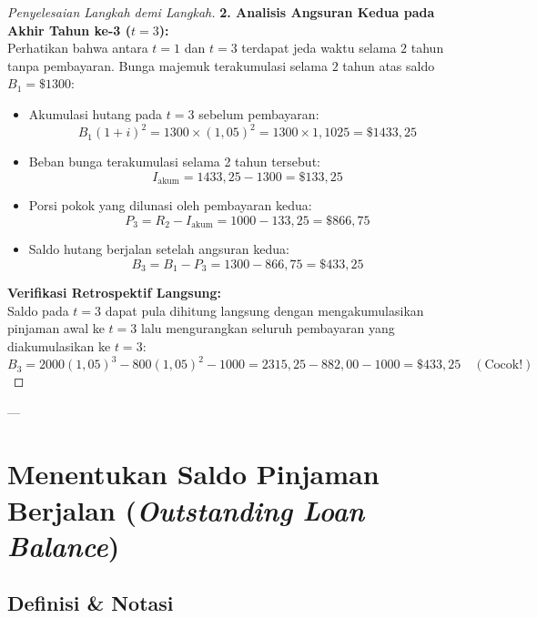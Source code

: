 \documentclass[11pt,a4paper]{article}
\begin{document}
\begin{proof}[Penyelesaian Langkah demi Langkah]
\noindent\textbf{2. Analisis Angsuran Kedua pada Akhir Tahun ke-3 ($t=3$):}\\[0.3em]
Perhatikan bahwa antara $t=1$ dan $t=3$ terdapat jeda waktu selama $2$ tahun tanpa pembayaran. Bunga majemuk terakumulasi selama $2$ tahun atas saldo $B_1 = \$1300$:
\begin{itemize}
    \item Akumulasi hutang pada $t=3$ sebelum pembayaran:
    \begin{equation*}
        B_1 (1+i)^2 = 1300 \times (1{,}05)^2 = 1300 \times 1{,}1025 = \$1433{,}25
    \end{equation*}
    \item Beban bunga terakumulasi selama 2 tahun tersebut:
    \begin{equation*}
        I_{\text{akum}} = 1433{,}25 - 1300 = \$133{,}25
    \end{equation*}
    \item Porsi pokok yang dilunasi oleh pembayaran kedua:
    \begin{equation*}
        P_3 = R_2 - I_{\text{akum}} = 1000 - 133{,}25 = \$866{,}75
    \end{equation*}
    \item Saldo hutang berjalan setelah angsuran kedua:
    \begin{equation*}
        B_3 = B_1 - P_3 = 1300 - 866{,}75 = \$433{,}25
    \end{equation*}
\end{itemize}

\noindent\textbf{Verifikasi Retrospektif Langsung:}\\[0.3em]
Saldo pada $t=3$ dapat pula dihitung langsung dengan mengakumulasikan pinjaman awal ke $t=3$ lalu mengurangkan seluruh pembayaran yang diakumulasikan ke $t=3$:
\begin{equation*}
    B_3 = 2000(1{,}05)^3 - 800(1{,}05)^2 - 1000 = 2315{,}25 - 882{,}00 - 1000 = \$433{,}25 \quad (\text{Cocok!})
\end{equation*}
\end{proof}

---

\section{Menentukan Saldo Pinjaman Berjalan (\textit{Outstanding Loan Balance})}

\subsection{Definisi \& Notasi}
\end{document}
